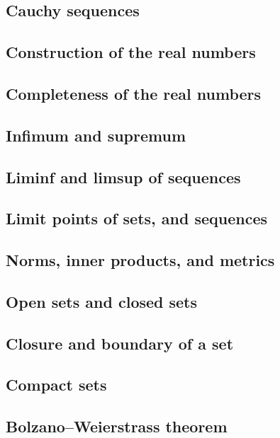 \documentclass[11pt]{article}
\theoremstyle{definition}
\theoremstyle{plain}
\theoremstyle{remark}
\begin{document}
\subsection{Cauchy sequences}

\subsection{Construction of the real numbers}

\subsection{Completeness of the real numbers}

\subsection{Infimum and supremum}

\subsection{Liminf and limsup of sequences}

\subsection{Limit points of sets, and sequences}

\subsection{Norms, inner products, and metrics}

\subsection{Open sets and closed sets}

\subsection{Closure and boundary of a set}

\subsection{Compact sets}

\subsection{Bolzano–Weierstrass theorem}
\end{document}
